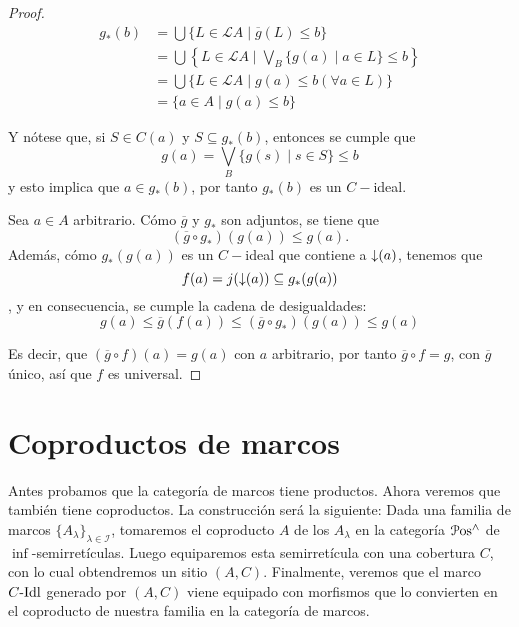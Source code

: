 \begin{proof}
    \begin{align*}
        g_*(b) & = \bigcup\{L\in\mathcal{L}A\mid\overline{g}(L)\leq b\} \\
               & = \bigcup\left\{L\in\mathcal{L}A\mid \bigvee_B\{g(a)\mid a\in L\}\leq b\right\} \\
               & = \bigcup\{L\in\mathcal{L}A\mid g(a)\leq b (\forall a \in L)\} \\
               & = \{a\in A\mid g(a)\leq b\} 
    \end{align*}

    Y nótese que, si $S\in C(a)$ y $S\subseteq g_*(b)$, entonces se cumple que
    \begin{equation*}
        g(a)= \bigvee_B\{g(s)\mid s\in S\}\leq b
    \end{equation*}
    y esto implica que $a\in g_*(b)$, por tanto $g_*(b)$ es un $C-$ideal. 

    Sea $a\in A$ arbitrario. Cómo $\overline{g}$ y $g_*$ son adjuntos, se tiene que
    \begin{equation*}
        (\overline{g}\circ g_*)(g(a))\leq g(a).
    \end{equation*}
    Además, cómo $g_*(g(a))$ es un $C-$ideal que contiene a ${\downarrow}(a)$, tenemos que $$f(a)=j({\downarrow}(a))\subseteq g_*(g(a))$$, y en consecuencia, se cumple la cadena de desigualdades:
    \begin{equation*}
        g(a)\leq\overline{g}(f(a))\leq(\overline{g}\circ g_*)(g(a))\leq g(a)
    \end{equation*}

    Es decir, que $(\overline{g}\circ f)(a)=g(a)$
    con $a$ arbitrario,
    por tanto $\overline{g}\circ f = g$,
    con $\overline{g}$ único, así que $f$ es universal.
\end{proof}

\section{Coproductos de marcos}

Antes probamos que la categoría de marcos tiene productos.
Ahora veremos que también tiene coproductos.
La construcción será la siguiente:
Dada una familia de marcos $\{A_\lambda\}_{\lambda\in\mathscr I}$,
tomaremos el coproducto $A$ de los $A_\lambda$
en la categoría $\mathcal{P}\mathrm{os}^{\wedge}$ de $\inf$-semirretículas. Luego
equiparemos esta semirretícula con una cobertura $C$, con lo cual
obtendremos un sitio $(A,C)$.
Finalmente, veremos que el marco $C\text{-}\mathrm{Idl}$ generado por $(A,C)$
viene equipado con morfismos que lo convierten en el coproducto
de nuestra familia en la categoría de marcos.

